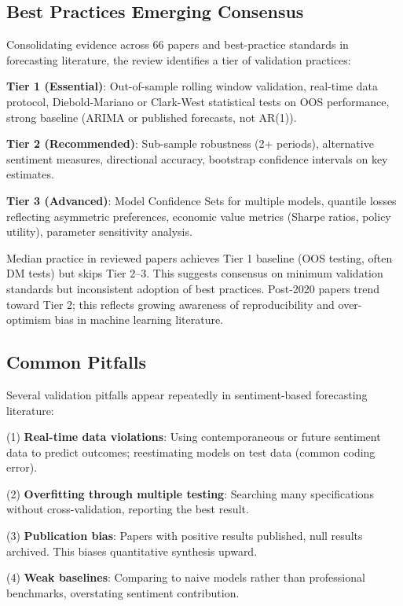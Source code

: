 \documentclass[11pt,twocolumn]{article}
\begin{document}
\subsection{Best Practices Emerging Consensus}

Consolidating evidence across 66 papers and best-practice standards in forecasting literature, the review identifies a tier of validation practices:

\textbf{Tier 1 (Essential)}: Out-of-sample rolling window validation, real-time data protocol, Diebold-Mariano or Clark-West statistical tests on OOS performance, strong baseline (ARIMA or published forecasts, not AR(1)).

\textbf{Tier 2 (Recommended)}: Sub-sample robustness (2+ periods), alternative sentiment measures, directional accuracy, bootstrap confidence intervals on key estimates.

\textbf{Tier 3 (Advanced)}: Model Confidence Sets for multiple models, quantile losses reflecting asymmetric preferences, economic value metrics (Sharpe ratios, policy utility), parameter sensitivity analysis.

Median practice in reviewed papers achieves Tier 1 baseline (OOS testing, often DM tests) but skips Tier 2--3. This suggests consensus on minimum validation standards but inconsistent adoption of best practices. Post-2020 papers trend toward Tier 2; this reflects growing awareness of reproducibility and over-optimism bias in machine learning literature.

\subsection{Common Pitfalls}

Several validation pitfalls appear repeatedly in sentiment-based forecasting literature:

\noindent
(1) \textbf{Real-time data violations}: Using contemporaneous or future sentiment data to predict outcomes; reestimating models on test data (common coding error). 

\noindent
(2) \textbf{Overfitting through multiple testing}: Searching many specifications without cross-validation, reporting the best result.

\noindent
(3) \textbf{Publication bias}: Papers with positive results published, null results archived. This biases quantitative synthesis upward.

\noindent
(4) \textbf{Weak baselines}: Comparing to naive models rather than professional benchmarks, overstating sentiment contribution.
\end{document}
